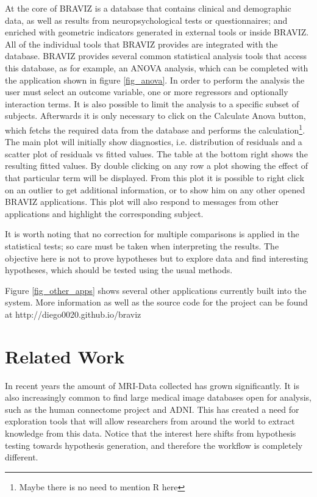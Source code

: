 \documentclass[utf8]{frontiersSCNS} %
\begin{document}
At the core of BRAVIZ is a database that contains clinical and demographic data, as well as results from neuropsychological tests or questionnaires; and enriched with geometric indicators generated in external tools or inside BRAVIZ. All of the individual tools that BRAVIZ provides are integrated with the database. BRAVIZ provides several common statistical analysis tools that access this database, as for example, an ANOVA  analysis, which can be completed with the application shown in figure \ref{fig_anova}. In order to perform the analysis the user must select an outcome variable, one or more regressors and optionally interaction terms. It is also possible to limit the analysis to a specific subset of subjects. Afterwards it is only necessary to click on the Calculate Anova button, which fetchs the required data from the database and performs the calculation\footnote{Maybe there is no need to mention R here}. The main plot will initially show diagnostics, i.e. distribution of residuals and a scatter plot of residuals vs fitted values. The table at the bottom right shows the resulting fitted values. By double clicking on any row a plot showing the effect of that particular term will be displayed. From this plot it is possible to right click on an outlier to get additional information, or to show him on any other opened BRAVIZ applications. This plot will also respond to messages from other applications and highlight the corresponding subject.

It is worth noting that no correction for multiple comparisons is applied in the statistical tests; so care must be taken when interpreting the results. The objective here is not to prove hypotheses but to explore data and find interesting hypotheses, which should be tested using the usual methods.

Figure \ref{fig_other_apps} shows several other applications currently built into the system. More information as well as the source code for the project can be found at http://diego0020.github.io/braviz


\section{Related Work}

In recent years the amount of MRI-Data collected has grown significantly. It is also increasingly common to find large medical image databases open for analysis, such as the human connectome project\citep{rosen_human_2010} and ADNI\citep{jack_alzheimers_2008}. This has created a need for exploration tools that will allow researchers from around the world to extract knowledge from this data. Notice that the interest here shifts from hypothesis testing towards hypothesis generation, and therefore the workflow is completely different.
  
\end{document}
